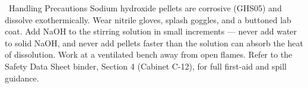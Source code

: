 \begin{hazardbox}{\faExclamationTriangle\ Handling Precautions}
Sodium hydroxide pellets are corrosive (GHS05) and dissolve exothermically. Wear nitrile
gloves, splash goggles, and a buttoned lab coat. Add NaOH to the stirring solution in small
increments --- never add water to solid NaOH, and never add pellets faster than the solution
can absorb the heat of dissolution. Work at a ventilated bench away from open flames. Refer
to the Safety Data Sheet binder, Section 4 (Cabinet C-12), for full first-aid and spill
guidance.
\end{hazardbox}
